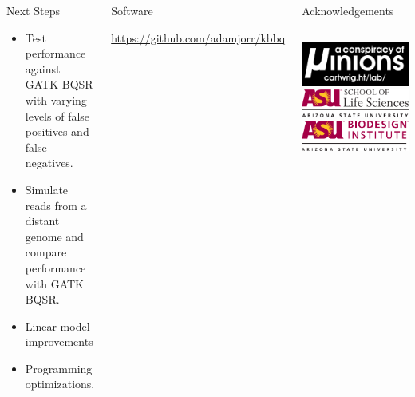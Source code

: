 \documentclass{beamer}
\begin{document}
\begin{frame}{}
\begin{columns}

\begin{block}{Next Steps}
\begin{itemize}
	\item Test performance against GATK BQSR with varying levels of false positives and false negatives.
	\item Simulate reads from a distant genome and compare performance with GATK BQSR.
	\item Linear model improvements
	\item Programming optimizations.
\end{itemize}
\end{block}


\begin{block}{Software}

 \url{https://github.com/adamjorr/kbbq}

\end{block}

\begin{block}{Acknowledgements}


\begin{columns}
\includegraphics[width=\linewidth]{lab_logo.pdf}
\includegraphics[width=\linewidth]{sols_logo.pdf}
\includegraphics[width=\linewidth]{biodesign_logo.pdf}
\end{columns}


\end{block}
\end{columns}
\end{frame}
\end{document}
